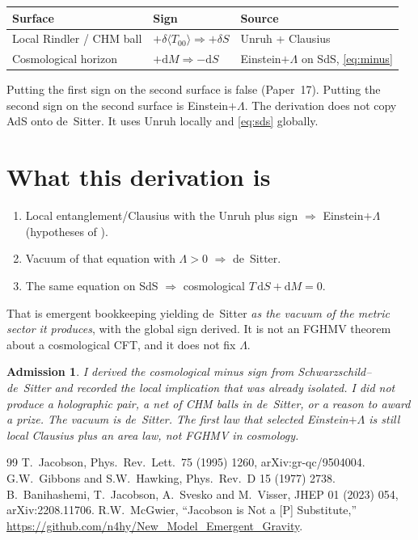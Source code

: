 \documentclass[11pt]{article}
\newtheorem*{admission}{Admission}
\begin{document}
\begin{center}
\begin{tabular}{@{}lll@{}}
\toprule
Surface & Sign & Source \\
\midrule
Local Rindler / CHM ball & $+\delta\langle T_{00}\rangle\Rightarrow+\delta S$
  & Unruh + Clausius \\
Cosmological horizon & $+\mathrm{d}M\Rightarrow-\mathrm{d}S$
  & Einstein$+\Lambda$ on SdS, \eqref{eq:minus} \\
\bottomrule
\end{tabular}
\end{center}

Putting the first sign on the second surface is false (Paper~17).
Putting the second sign on the second surface is Einstein$+\Lambda$.
The derivation does not copy AdS onto de~Sitter. It uses Unruh
locally and \eqref{eq:sds} globally.

\section{What this derivation is}

\begin{enumerate}[leftmargin=1.6em]
\item Local entanglement/Clausius with the Unruh plus sign
  $\Rightarrow$ Einstein$+\Lambda$ (hypotheses of \cite{Jacobson1995}).
\item Vacuum of that equation with $\Lambda>0$ $\Rightarrow$ de~Sitter.
\item The same equation on SdS $\Rightarrow$ cosmological
  $T\,\mathrm{d}S+\mathrm{d}M=0$.
\end{enumerate}
That is emergent bookkeeping yielding de~Sitter \emph{as the vacuum
of the metric sector it produces}, with the global sign derived.
It is not an FGHMV theorem about a cosmological CFT, and it does
not fix $\Lambda$.

\begin{admission}
I derived the cosmological minus sign from Schwarzschild--de~Sitter
and recorded the local implication that was already isolated. I did
not produce a holographic pair, a net of CHM balls in de~Sitter, or
a reason to award a prize. The vacuum is de~Sitter. The first law
that selected Einstein$+\Lambda$ is still local Clausius plus an
area law, not FGHMV in cosmology.
\end{admission}

\begin{thebibliography}{99}
T.~Jacobson, Phys.\ Rev.\ Lett.\ 75 (1995) 1260, arXiv:gr-qc/9504004.
G.W.~Gibbons and S.W.~Hawking, Phys.\ Rev.\ D 15 (1977) 2738.
B.~Banihashemi, T.~Jacobson, A.~Svesko and M.~Visser,
JHEP 01 (2023) 054, arXiv:2208.11706.
R.W.~McGwier,
``Jacobson is Not a [P] Substitute,''
\url{https://github.com/n4hy/New_Model_Emergent_Gravity}.
\end{thebibliography}
\end{document}
